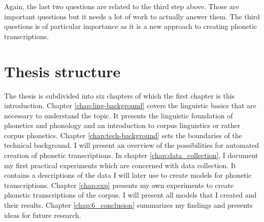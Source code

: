 Again, the last two questions are related to the third step above. Those are important questions but it needs a lot of work to actually answer them. The third questions is of particular importance as it is a new approach to creating phonetic transcriptions. 

\section{Thesis structure}

The thesis is subdivided into six chapters of which the first chapter is this introduction. Chapter \ref{chap:ling-background} covers the linguistic basics that are necessary to understand the topic. It presents the linguistic foundation of phonetics and phonology and an introduction to corpus linguistics or rather corpus phonetics. Chapter \ref{chap:tech-background} sets the boundaries of the technical background. I will present an overview of the possibilities for automated creation of phonetic transcriptions. In chapter \ref{chap:data_collection}, I document my first practical experiments which are concerned with data collection. It contains a descriptions of the data I will later use to create models for phonetic transcriptions. Chapter \ref{chap:exp} presents my own experiments to create phonetic transcriptions of the corpus. I will present all models that I created and their results. Chapter \ref{chap:6_conclusion} summarizes my findings and presents ideas for future research.


